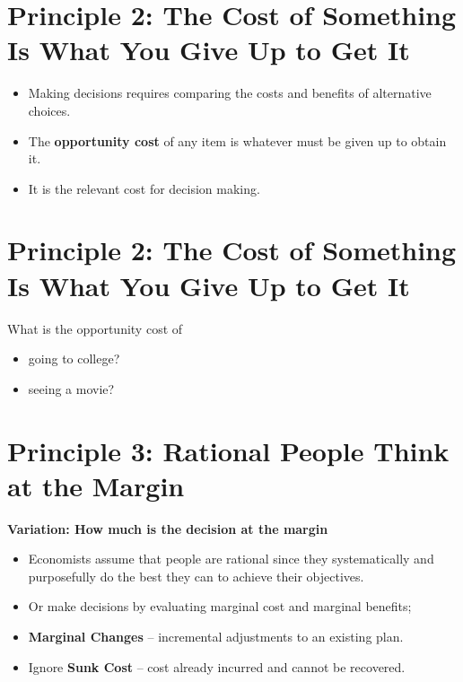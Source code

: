\documentclass[
]{book}
\begin{document}
\hypertarget{principle-2-the-cost-of-something-is-what-you-give-up-to-get-it}{%
\section{Principle 2: The Cost of Something Is What You Give Up to Get It}\label{principle-2-the-cost-of-something-is-what-you-give-up-to-get-it}}

\begin{itemize}
\item
  Making decisions requires comparing the costs and benefits of alternative choices.
\item
  The \textbf{\color{red} opportunity cost} of any item is whatever must be given up to obtain it.
\item
  It is the relevant cost for decision making.
\end{itemize}

\hypertarget{principle-2-the-cost-of-something-is-what-you-give-up-to-get-it-1}{%
\section{Principle 2: The Cost of Something Is What You Give Up to Get It}\label{principle-2-the-cost-of-something-is-what-you-give-up-to-get-it-1}}

What is the opportunity cost of

\begin{itemize}
\item
  going to college?
\item
  seeing a movie?
\end{itemize}

\hypertarget{principle-3-rational-people-think-at-the-margin}{%
\section{Principle 3: Rational People Think at the Margin}\label{principle-3-rational-people-think-at-the-margin}}

\textbf{Variation: How much is the decision at the margin}

\begin{itemize}
\item
  Economists assume that people are rational since they systematically and purposefully do the best they can to achieve their objectives.
\item
  Or make decisions by evaluating marginal cost and marginal benefits;
\item
  \textbf{Marginal Changes} -- incremental adjustments to an existing plan.
\item
  Ignore \textbf{Sunk Cost} -- cost already incurred and cannot be recovered.
\end{itemize}
\end{document}
